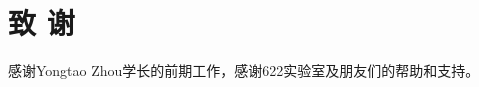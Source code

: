\chapter*{致\texorpdfstring{\qquad}{} 谢}
\thispagestyle{main}
感谢Yongtao Zhou学长的前期工作，感谢622实验室及朋友们的帮助和支持。
